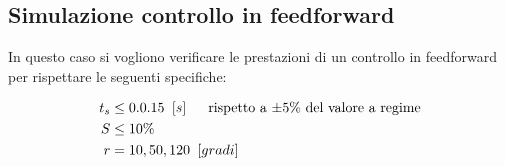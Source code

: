 		
		
		
	\subsection{Simulazione controllo in feedforward}	
	\label{subsec:feedforwardSim}
	
		In questo caso si vogliono verificare le prestazioni di un controllo in feedforward per rispettare le seguenti specifiche:

		\begin{align*}
			t_s &\le 0.0.15 \singleSpacing [s] \trippleSpacing \textnormal{rispetto a $\pm 5 \%$ del valore a regime} \\
			S &\le 10  \% \\
			r &= 10,50,120 \singleSpacing [gradi] \\
		\end{align*}	
		
		
		
		
		
		